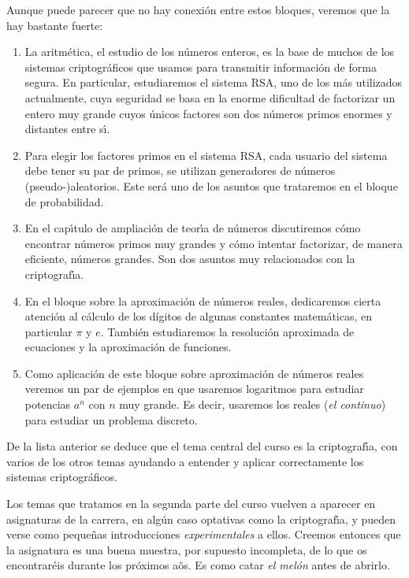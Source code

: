 Aunque puede parecer que no hay conexi\'on entre estos bloques, veremos que  la
hay bastante fuerte:
\begin{enumerate}
 \item La aritm\'etica, el estudio de los n\'umeros enteros, es la base de
muchos de los sistemas criptogr\'aficos que usamos para transmitir informaci\'on
de forma segura. En particular, estudiaremos el sistema RSA, uno de los m\'as
utilizados actualmente,  cuya seguridad se basa en la enorme dificultad de
factorizar un entero muy grande cuyos \'unicos factores son dos n\'umeros primos
enormes y distantes entre s\'{\i}. 
\item Para elegir los factores primos en el sistema RSA, cada usuario del
sistema debe tener su par de primos, se utilizan generadores de n\'umeros
(pseudo-)aleatorios.  Este ser\'a uno de los asuntos que trataremos en el bloque
de probabilidad. 
\item En el cap\'{\i}tulo de ampliaci\'on de teor\'{\i}a de n\'umeros discutiremos c\'omo encontrar n\'umeros primos muy grandes y c\'omo intentar factorizar, de manera eficiente, n\'umeros grandes. Son dos asuntos muy relacionados con la criptograf\'{\i}a.  
\item En el bloque sobre la aproximaci\'on de n\'umeros reales, dedicaremos
cierta atenci\'on al c\'alculo  de los d\'igitos de algunas constantes
matem\'aticas, en particular $\pi$ y $e$. Tambi\'en estudiaremos la resoluci\'on aproximada de ecuaciones y la aproximaci\'on de funciones. 

\item Como aplicaci\'on de este bloque sobre aproximaci\'on de n\'umeros reales
veremos un par de ejemplos  en que usaremos logaritmos para estudiar potencias
$a^n$ con $n$ muy grande. Es decir, usaremos los reales ({\itshape el continuo}) para estudiar un problema discreto. 
 \end{enumerate}


De la lista anterior se deduce que el tema central del curso es la
criptograf\'{\i}a,  con varios de los otros temas ayudando a entender y aplicar
correctamente los sistemas criptogr\'aficos.

Los temas que tratamos en la segunda parte del curso vuelven a aparecer en
asignaturas de la carrera, en alg\'un caso optativas como la criptograf\'{\i}a,
y pueden verse como peque\~nas introducciones {\itshape experimentales} a
ellos. Creemos entonces que la asignatura es una buena muestra, por supuesto
 incompleta,  de lo que os encontrar\'eis durante los pr\'oximos a\~os. Es como
catar {\itshape el mel\'on} antes de abrirlo.
 

